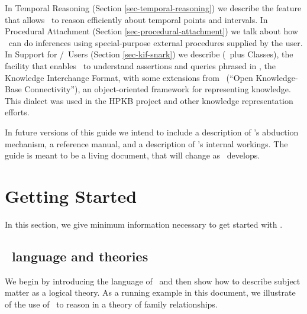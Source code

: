 In Temporal Reasoning (Section \ref{sec-temporal-reasoning}) we describe the
feature that allows \snark\  to reason efficiently about temporal points and
intervals.  In Procedural Attachment (Section
\ref{sec-procedural-attachment}) we talk about how \snark\  can do inferences
using special-purpose external procedures supplied by the user.  In Support
for \kif\//\okbc\   Users  (Section \ref{sec-kif-snark}) we describe
\kifsnark\/ (\kif\  plus Classes), the facility that enables \snark\  to
understand assertions and queries phrased in \kif\/, the Knowledge
Interchange Format, with some extensions from \okbc\ (``Open
Knowledge-Base Connectivity''), an object-oriented framework for
representing knowledge.  This dialect was used in the HPKB project
and other knowledge representation efforts.

In future versions of this guide we intend to include a description of
\snark's abduction mechanism, a reference manual, and a description of
\snark's internal workings.  The guide is meant to be a living document, that
will change as \snark\  develops.





\label{part-tutorial}
\section{Getting Started}
\label{sec-getting-started}
In this section, we give minimum information necessary to get
started with \snark.


\subsection{\Snark\  language and theories}
\label{subsec-language-and-theories}
We begin by introducing the language of \snark\  and then show how to describe
subject matter as a logical theory.  As a running example in this document,
we illustrate of the use of \snark\  to reason in a theory of family
relationships.

